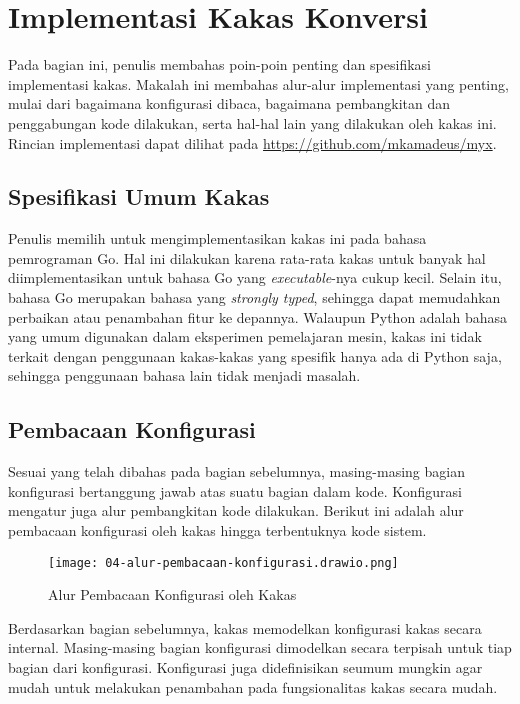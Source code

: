 \section{Implementasi Kakas Konversi}

Pada bagian ini, penulis membahas poin-poin penting dan spesifikasi implementasi kakas.
Makalah ini membahas alur-alur implementasi yang penting, mulai dari bagaimana konfigurasi dibaca, bagaimana pembangkitan dan penggabungan kode dilakukan, serta hal-hal lain yang dilakukan oleh kakas ini.
Rincian implementasi dapat dilihat pada \url{https://github.com/mkamadeus/myx}.

\subsection{Spesifikasi Umum Kakas}

Penulis memilih untuk mengimplementasikan kakas ini pada bahasa pemrograman Go.
Hal ini dilakukan karena rata-rata kakas untuk banyak hal diimplementasikan untuk bahasa Go yang \textit{executable}-nya cukup kecil.
Selain itu, bahasa Go merupakan bahasa yang \textit{strongly typed}, sehingga dapat memudahkan perbaikan atau penambahan fitur ke depannya.
Walaupun Python adalah bahasa yang umum digunakan dalam eksperimen pemelajaran mesin, kakas ini tidak terkait dengan penggunaan kakas-kakas yang spesifik hanya ada di Python saja, sehingga penggunaan bahasa lain tidak menjadi masalah.

\subsection{Pembacaan Konfigurasi}

Sesuai yang telah dibahas pada bagian sebelumnya, masing-masing bagian konfigurasi bertanggung jawab atas suatu bagian dalam kode.
Konfigurasi mengatur juga alur pembangkitan kode dilakukan.
Berikut ini adalah alur pembacaan konfigurasi oleh kakas hingga terbentuknya kode sistem.

\begin{figure}[ht]
    \centering
    \texttt{[image: 04-alur-pembacaan-konfigurasi.drawio.png]}
    \caption{Alur Pembacaan Konfigurasi oleh Kakas}\label{fig:04-flowchart-config-read}
\end{figure}

Berdasarkan bagian sebelumnya, kakas memodelkan konfigurasi kakas secara internal.
Masing-masing bagian konfigurasi dimodelkan secara terpisah untuk tiap bagian dari konfigurasi.
Konfigurasi juga didefinisikan seumum mungkin agar mudah untuk melakukan penambahan pada fungsionalitas kakas secara mudah.


